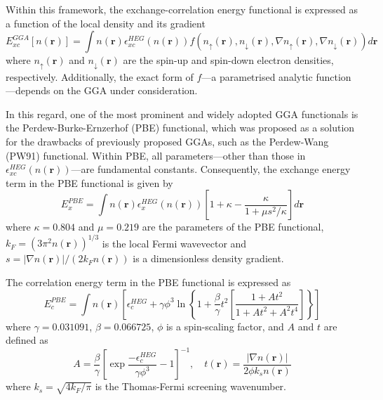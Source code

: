 Within this framework, the exchange-correlation energy functional is expressed as a function of the local density and its gradient 
\begin{equation}
  \label{eq62}
  E_{xc}^{GGA}[n(\mathbf{r})] = \int n(\mathbf{r}) \epsilon_{xc}^{HEG}(n(\mathbf{r})) f(n_{\uparrow}(\mathbf{r}), n_{\downarrow}(\mathbf{r}),\nabla n_{\uparrow}(\mathbf{r}), \nabla n_{\downarrow}(\mathbf{r})) d\mathbf{r}
\end{equation}
where $n_{\uparrow}(\mathbf{r})$ and $n_{\downarrow}(\mathbf{r})$ are the spin-up and spin-down electron densities, respectively. Additionally, the exact form of $f$---a parametrised analytic function---depends on the GGA under consideration.  

In this regard, one of the most prominent and widely adopted GGA functionals is the Perdew-Burke-Ernzerhof (PBE)\supercite{Perdew1996} functional, which was proposed as a solution for the drawbacks of previously proposed GGAs, such as the Perdew-Wang (PW91) functional. Within PBE, all parameters---other than those in $\epsilon_{xc}^{HEG}(n(\mathbf{r}))$---are fundamental constants. Consequently, the exchange energy term in the PBE functional is given by 
\begin{equation}
  \label{eq63}
  E_{x}^{PBE} = \int n(\mathbf{r}) \epsilon_{x}^{HEG}(n(\mathbf{r})) \left[1 + \kappa - \frac{\kappa}{1 +  \mu s^2/\kappa}\right] d\mathbf{r}
\end{equation}
where $\kappa = 0.804$ and $\mu = 0.219$ are the parameters of the PBE functional, $k_F = (3\pi^2 n(\mathbf{r}))^{1/3}$ is the local Fermi wavevector and $s = |\nabla n(\mathbf{r})|/(2k_F n(\mathbf{r}))$ is a dimensionless density gradient.

The correlation energy term in the PBE functional is expressed as 
\begin{equation}
  \label{eq64}
  E_{c}^{PBE} = \int n(\mathbf{r}) \left[\epsilon_{c}^{HEG} + 
  \gamma \phi^3 \ln\left\{ 1 + \frac{\beta}{\gamma}t^2 
  \left[ 
  \frac{1 + At^2}{1 + At^2 + A^2t^4}
  \right]
  \right\} 
  \right]
\end{equation}
where $\gamma = 0.031091$, $\beta = 0.066725$, $\phi$ is a spin-scaling factor, and $A$ and $t$ are defined as 
\begin{equation}
  \label{eq65}
  A = \frac{\beta}{\gamma} \left[\exp{\frac{-\epsilon_{c}^{HEG}}{\gamma\phi^3}} - 1  \right]^{-1}, \quad 
  t(\mathbf{r}) = \frac{|\nabla n(\mathbf{r})|}{2\phi k_s n(\mathbf{r})}
\end{equation}
where $k_s = \sqrt{4 k_F / \pi}$ is the Thomas-Fermi screening wavenumber.

